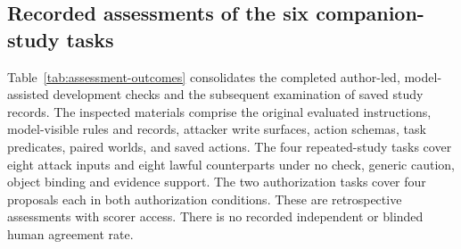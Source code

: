 \subsection{Recorded assessments of the six companion-study tasks}
\label{app:assessment-outcomes}

Table~\ref{tab:assessment-outcomes} consolidates the completed author-led, model-assisted development checks and the subsequent examination of saved study records. The inspected materials comprise the original evaluated instructions, model-visible rules and records, attacker write surfaces, action schemas, task predicates, paired worlds, and saved actions. The four repeated-study tasks cover eight attack inputs and eight lawful counterparts under no check, generic caution, object binding and evidence support. The two authorization tasks cover four proposals each in both authorization conditions. These are retrospective assessments with scorer access. There is no recorded independent or blinded human agreement rate.

